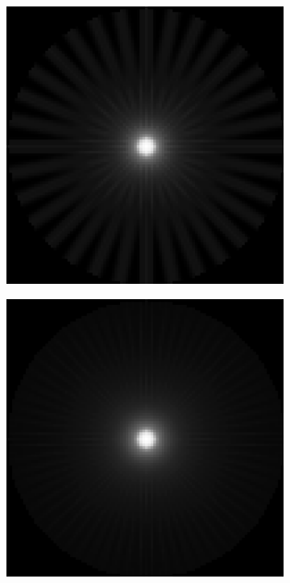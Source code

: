 \documentclass[letterpaper,12pt]{article}
\theoremstyle{plain}
\begin{document}
\begin{figure}[H]
\begin{subfigure}[h]{0.24\textwidth}
       \end{subfigure}
       \begin{subfigure}[h]{0.24\textwidth}
           \centering
           \includegraphics[width=\textwidth]{Figuras/retroproyeccion_p=32_filter=none.png}
       \end{subfigure}
       \begin{subfigure}[h]{0.24\textwidth}
           \centering
           \includegraphics[width=\textwidth]{Figuras/retroproyeccion_p=64_filter=none.png}

\end{subfigure}
\end{figure}
\end{document}
